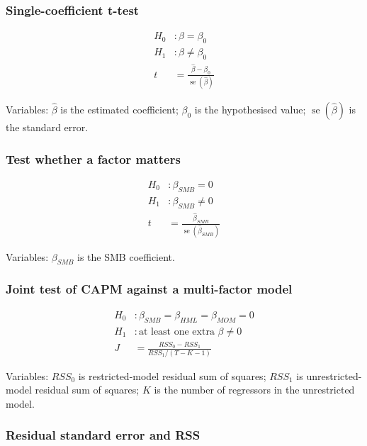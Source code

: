 \documentclass[
  8pt,
  twocolumn]{extarticle}
\begin{document}
\subsubsection{Single-coefficient
t-test}\label{single-coefficient-t-test}

\[
\begin{aligned}
H_0&:\beta=\beta_0\\
H_1&:\beta\ne\beta_0\\
t&=\frac{\hat\beta-\beta_0}{\operatorname{se}(\hat\beta)}
\end{aligned}
\]

Variables: \(\hat\beta\) is the estimated coefficient; \(\beta_0\) is
the hypothesised value; \(\operatorname{se}(\hat\beta)\) is the standard
error.

\subsubsection{Test whether a factor
matters}\label{test-whether-a-factor-matters}

\[
\begin{aligned}
H_0&:\beta_{SMB}=0\\
H_1&:\beta_{SMB}\ne0\\
t&=\frac{\hat\beta_{SMB}}{\operatorname{se}(\hat\beta_{SMB})}
\end{aligned}
\]

Variables: \(\beta_{SMB}\) is the SMB coefficient.

\subsubsection{Joint test of CAPM against a multi-factor
model}\label{joint-test-of-capm-against-a-multi-factor-model}

\[
\begin{aligned}
H_0&:\beta_{SMB}=\beta_{HML}=\beta_{MOM}=0\\
H_1&:\text{at least one extra }\beta\ne0\\
J&=\frac{RSS_0-RSS_1}{RSS_1/(T-K-1)}
\end{aligned}
\]

Variables: \(RSS_0\) is restricted-model residual sum of squares;
\(RSS_1\) is unrestricted-model residual sum of squares; \(K\) is the
number of regressors in the unrestricted model.

\subsubsection{Residual standard error and
RSS}\label{residual-standard-error-and-rss}
\end{document}
